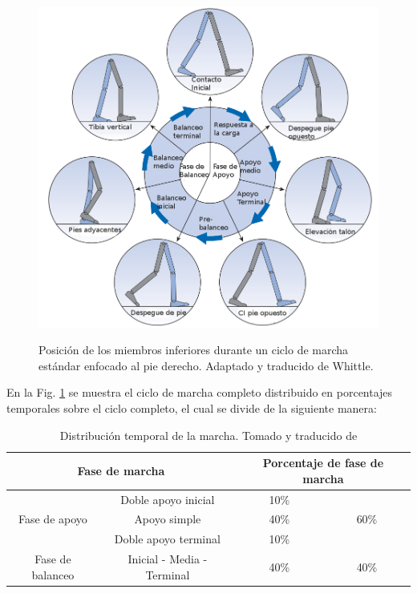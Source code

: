 \documentclass[12pt,english]{article}
\providecommand{\tabularnewline}{\\}
\begin{document}
\begin{description}
\begin{figure}
\begin{centering}
\includegraphics[scale=0.33]{Singlephaseesp.png}
\par\end{centering}


\label{fig:Posici=0000F3n-de-los}Posición de los miembros inferiores
durante un ciclo de marcha estándar enfocado al pie derecho. Adaptado
y traducido de Whittle\cite{Whittle2007}.

\end{figure}



En la Fig. \ref{fig:Posici=0000F3n-de-los} se muestra el ciclo de
marcha completo distribuido en porcentajes temporales sobre el ciclo
completo, el cual se divide de la siguiente manera:


\begin{table}[H]
\caption{Distribución temporal de la marcha. Tomado y traducido de \cite{Lemoyne} }


\centering{}%
\begin{tabular}{|c|c|c|c|}
\hline 
\multicolumn{2}{|c|}{Fase de marcha} & \multicolumn{2}{c|}{Porcentaje de fase de marcha}\tabularnewline
\hline 
\hline 
\multirow{3}{*}{Fase de apoyo} & Doble apoyo inicial & 10\% & \multirow{3}{*}{60\%}\tabularnewline
\cline{2-3} 
 & Apoyo simple & 40\% & \tabularnewline
\cline{2-3} 
 & Doble apoyo terminal & 10\% & \tabularnewline
\hline 
Fase de balanceo & Inicial - Media - Terminal & 40\% & 40\%\tabularnewline
\hline 
\end{tabular}
\end{table}




\end{description}
\end{document}
